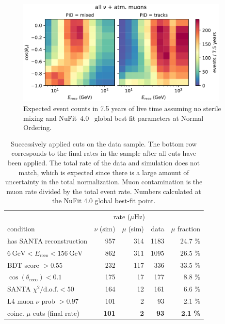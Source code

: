 \begin{figure}
    \centering
    \includegraphics[width=0.95\textwidth]{figures/measurement/simulation_and_data/binning/plot_maps_total.pdf}
    \caption{Expected event counts in 7.5 years of live time assuming no sterile mixing and NuFit~4.0~\cite{nufit40} global best fit parameters at Normal Ordering.}
    \label{fig:nominal-hist-null-hypo}
\end{figure}

\begin{table}
\caption{Successively applied cuts on the data sample. The bottom row corresponds to the final rates in the sample after all cuts have been applied. The total rate of the data and simulation does not match, which is expected since there is a large amount of uncertainty in the total normalization. Muon contamination is the muon rate divided by the total event rate. Numbers calculated at the NuFit 4.0 global best-fit point.}
\centering
\begin{tabular}{@{}lrrrr@{}}\toprule
& \multicolumn{3}{c}{rate ($\mu$Hz)} & \\ \cmidrule{2-4}
condition                              & {$\nu$ (sim)} & {$\mu$ (sim)} & {data} & {$\mu$ fraction} \\ \midrule
has SANTA reconstruction         & 957  & 314  & 1183 & 24.7 \%  \\
$\SI{6}{\giga\electronvolt} < E_\mathrm{reco}  < \SI{156}{\giga\electronvolt}$         & 862  & 311  & 1095 & 26.5 \%  \\
BDT score $>0.55$                      & 232  & 117  &  336 & 33.5 \%  \\
$\cos(\theta_{\mathrm{reco}}) < 0.1$   & 175  &  17  &  177 & 8.8 \%   \\
SANTA $\chi^2/\mathrm{d.o.f.} < 50$    & 164  &  12  &  161 & 6.6 \%   \\
L4 muon $\nu$ prob $> 0.97$            & 101  &   2  &   93 & 2.1 \% \\
\midrule\addlinespace
coinc. $\mu$ cuts (final rate) & \textbf{101} & \textbf{2} & \textbf{93} & \textbf{2.1 \%} \\ \bottomrule
\end{tabular}
\label{tab:muon-rejection-cut-rates}
\end{table}

